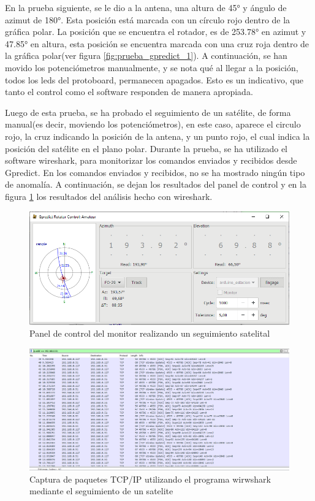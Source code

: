 En la prueba siguiente, se le dio a la antena, una altura de 45° y ángulo de azimut de 180°. Esta posición está marcada con un círculo rojo dentro de la gráfica polar. La posición que se encuentra el rotador, es de 253.78° en azimut y 47.85° en altura, esta posición se encuentra marcada con una cruz roja dentro de la gráfica polar(ver figura \ref{fig:prueba_gpredict_1}). A continuación, se han movido los potenciómetros manualmente,  y se nota qué al llegar a la posición, todos los leds del protoboard, permanecen apagados. Esto es un indicativo, que tanto el control como el software responden de manera apropiada. 

 
Luego de esta prueba, se ha probado el seguimiento de un satélite, de forma manual(es decir, moviendo los potenciómetros), en este caso, aparece el circulo rojo, la cruz indicando la posición de la antena, y un punto rojo, el cual indica la posición del satélite en el plano polar. Durante la prueba, se ha utilizado el software wireshark, para monitorizar los comandos enviados y recibidos desde Gpredict. En los comandos enviados y recibidos, no se ha mostrado ningún tipo de anomalía. A continuación, se dejan los resultados del panel de control y en la figura \ref{fig:wireshark_gpr} los resultados del análisis hecho con wireshark. 


\begin{figure}[ht]
	\centering
	\includegraphics[scale=0.5]{gpredict_seguimiento_sat} 
	\caption{Panel de control del monitor realizando un seguimiento satelital} 
	
\end{figure}

\begin{figure}[ht]
	\includegraphics[scale=0.5]{wireshark_gpredict} 
	\caption{Captura de paquetes TCP/IP utilizando el programa wirwshark mediante el seguimiento de un satelite} 
	\label{fig:wireshark_gpr}
\end{figure}




